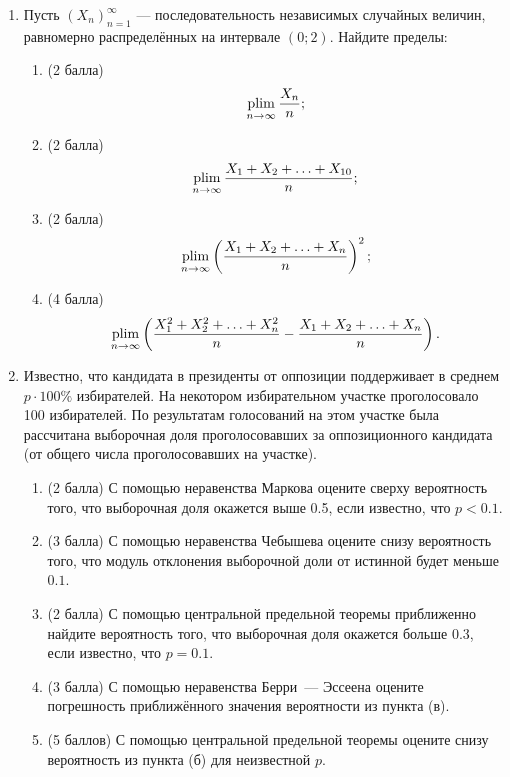 \begin{enumerate}
  \item Пусть $(X_n)_{n=1}^{\infty}$ — последовательность независимых случайных величин, равномерно распределённых на интервале $(0; 2)$. 
  Найдите пределы:
  
  \begin{enumerate}
      \item (2 балла) 
      \[
          \operatorname*{plim}_{n\to\infty} \frac{X_n}{n};
      \]
      \item (2 балла) 
      \[ 
          \operatorname*{plim}_{n\to\infty} \frac{X_1 + X_2 + \ldots + X_{10}}{n};
      \]
      \item (2 балла) 
      \[
           \operatorname*{plim}_{n\to\infty} \left(\frac{X_1 + X_2 + \ldots + X_n}{n}\right)^2;
           \]
      
      \item (4 балла) 
      \[
           \operatorname*{plim}_{n\to\infty} \left(\frac{X_1^2 + X_2^2 + \ldots + X_{n}^2}{n} - \frac{X_1 + X_2 + \ldots + X_{n}}{n}\right).
           \]
  \end{enumerate}
  
  \item Известно, что кандидата в президенты от оппозиции поддерживает в среднем $p\cdot 100\%$ избирателей. 
  На некотором избирательном участке проголосовало 100 избирателей. 
  По результатам голосований на этом участке была рассчитана выборочная доля проголосовавших 
  за оппозиционного кандидата (от общего числа проголосовавших на участке).
  
  \begin{enumerate}
      \item (2 балла) С помощью неравенства Маркова оцените сверху вероятность того, 
      что выборочная доля окажется выше 0.5, если известно, что $p<0.1$.
      \item (3 балла) С помощью неравенства Чебышева оцените снизу вероятность того, 
      что модуль отклонения выборочной доли от истинной будет меньше $0.1$.
      \item (2 балла) С помощью центральной предельной теоремы приближенно найдите вероятность того, 
      что выборочная доля окажется больше 0.3, если известно, что $p=0.1$.
      \item (3 балла) С помощью неравенства Берри~— Эссеена оцените погрешность приближённого значения вероятности из пункта (в).
      \item (5 баллов) С помощью центральной предельной теоремы оцените снизу вероятность из пункта (б) для неизвестной $p$.
  \end{enumerate}
  
  \end{enumerate}



